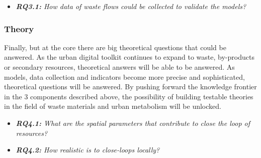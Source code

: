     \begin{itemize}
        \item \textit{\textbf{RQ3.1: }How data of waste flows could be collected to validate the models?}
    \end{itemize}



\subsubsection{Theory}
    Finally, but at the core there are big theoretical questions that could be answered. As the urban digital toolkit continues to expand to waste, by-products or secondary resources, theoretical answers will be able to be answered. As models, data collection and indicators become more precise  and sophisticated, theoretical questions will be answered. By pushing forward the knowledge frontier in the 3 components described above, the possibility of building testable theories in the field of waste materials and urban metabolism will be unlocked.  
    
    \begin{itemize}
        \item \textit{\textbf{RQ4.1: }What are the spatial parameters that contribute to close the loop of resources?}
        \item \textit{\textbf{RQ4.2: }How realistic is to close-loops locally?}
    \end{itemize}






    
    
    
    
